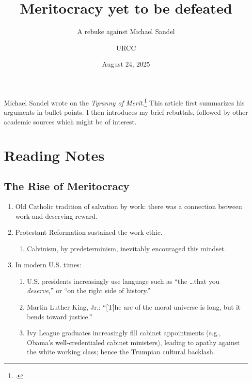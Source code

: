 \documentclass[12pt]{article}
\begin{document}
\title{Meritocracy yet to be defeated}
\subtitle{A rebuke against Michael Sandel}  %
\author{URCC}
\date{August 24, 2025}
\maketitle

\begin{preamble}
Michael Sandel wrote on the \emph{Tyranny of Merit}.\footcite{sandelTyrannyMeritWhats2020} This article first summarizes his arguments in bullet points. I then introduces my brief rebuttals, followed by other academic sources which might be of interest.
\end{preamble}

\section{Reading Notes}

\subsection{The Rise of Meritocracy}
\begin{enumerate}
    \item Old Catholic tradition of salvation by work: there was a connection between work and deserving reward.
    \item Protestant Reformation sustained the work ethic.
    \begin{enumerate}
        \item Calvinism, by predeterminism, inevitably encouraged this mindset.
    \end{enumerate}
    \item In modern U.S. times:
    \begin{enumerate}
        \item U.S. presidents increasingly use language such as ``the \ldots that you \emph{deserve},'' or ``on the right side of history.''
        \item Martin Luther King, Jr.: ``[T]he arc of the moral universe is long, but it bends toward justice.''
        \item Ivy League graduates increasingly fill cabinet appointments (e.g., Obama's well-credentialed cabinet ministers), leading to apathy against the white working class; hence the Trumpian cultural backlash.
    \end{enumerate}
\end{enumerate}
\end{document}
